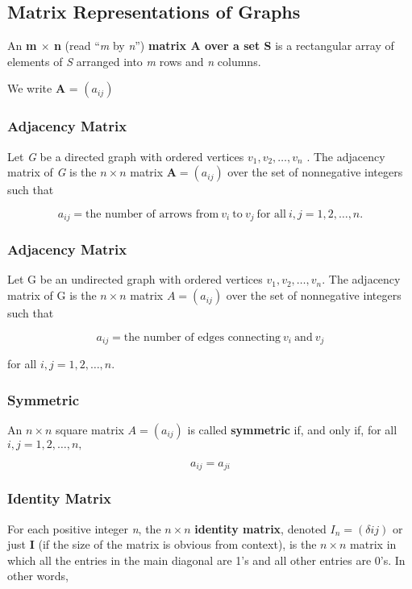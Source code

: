 \documentclass{article}
\begin{document}
\setcounter{section}{10}
\setcounter{subsection}{2}

\subsection{Matrix Representations of Graphs}
An \textbf{m $\times$ n} (read “\textit{m} by \textit{n}”) \textbf{matrix A over a set S} is a rectangular array of elements of \textit{S} arranged into \textit{m} rows and \textit{n} columns.

We write \textbf{A} = $(a_{ij})$

\subsubsection{Adjacency Matrix}
Let \textit{G} be a directed graph with ordered vertices $v_1, v_2, \ldots , v_n$ . The adjacency matrix of \textit{G} is the $n \times n$ matrix $\textbf{A} = ( a_{ij} )$ over the set of nonnegative integers such that

\begin{equation}
a_{ij} = \text{the number of arrows from} \ v_i \ \text{to} \ v_j \ \text{for all} \ i, j = 1, 2, \ldots, n.
\end{equation}

\subsubsection{Adjacency Matrix}
Let G be an undirected graph with ordered vertices $v_1, v_2, \ldots,v_n$. The adjacency matrix of G is the $n \times n$ matrix $A = ( a_{ij} )$ over the set of nonnegative integers such that

\begin{equation}
a_{ij} = \text{the number of edges connecting} \ v_i \ \text{and} \ v_j
\end{equation}

for all $i, j = 1, 2, \ldots, n$.

\subsubsection{Symmetric}
An $n \times n$ square matrix $A = ( a_{ij} )$ is called \textbf{symmetric} if, and only if, for all $i, j =
1, 2, \ldots, n,$

\begin{equation}
a_{ij} = a_{ji}
\end{equation}

\subsubsection{Identity Matrix}
For each positive integer \textit{n}, the $n \times n$ \textbf{identity matrix}, denoted \textbf{$I_n = (\delta {ij})$} or just \textbf{I} (if the size of the matrix is obvious from context), is the $n \times n$ matrix in which all the entries in the main diagonal are 1’s and all other entries are 0’s. In other words,
\end{document}
